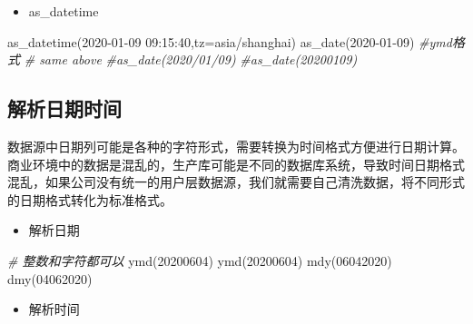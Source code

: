 \documentclass[
]{book}
\newenvironment{Shaded}{\begin{snugshade}}{\end{snugshade}}
\newcommand{\AttributeTok}[1]{\textcolor[rgb]{0.77,0.63,0.00}{#1}}
\newcommand{\CommentTok}[1]{\textcolor[rgb]{0.56,0.35,0.01}{\textit{#1}}}
\newcommand{\DecValTok}[1]{\textcolor[rgb]{0.00,0.00,0.81}{#1}}
\newcommand{\FunctionTok}[1]{\textcolor[rgb]{0.00,0.00,0.00}{#1}}
\newcommand{\NormalTok}[1]{#1}
\newcommand{\StringTok}[1]{\textcolor[rgb]{0.31,0.60,0.02}{#1}}
\providecommand{\tightlist}{%
  \setlength{\itemsep}{0pt}\setlength{\parskip}{0pt}}
\begin{document}
\begin{itemize}
\tightlist
\item
  as\_datetime
\end{itemize}

\begin{Shaded}
\begin{Highlighting}[]
\FunctionTok{as\_datetime}\NormalTok{(}\StringTok{\textquotesingle{}2020{-}01{-}09 09:15:40\textquotesingle{}}\NormalTok{,}\AttributeTok{tz=}\StringTok{\textquotesingle{}asia/shanghai\textquotesingle{}}\NormalTok{)}
\FunctionTok{as\_date}\NormalTok{(}\StringTok{\textquotesingle{}2020{-}01{-}09\textquotesingle{}}\NormalTok{) }\CommentTok{\#ymd格式}
\CommentTok{\# same above}
\CommentTok{\#as\_date(\textquotesingle{}2020/01/09\textquotesingle{})}
\CommentTok{\#as\_date(\textquotesingle{}20200109\textquotesingle{})}
\end{Highlighting}
\end{Shaded}

\hypertarget{ux89e3ux6790ux65e5ux671fux65f6ux95f4}{%
\subsection{解析日期时间}\label{ux89e3ux6790ux65e5ux671fux65f6ux95f4}}

数据源中日期列可能是各种的字符形式，需要转换为时间格式方便进行日期计算。商业环境中的数据是混乱的，生产库可能是不同的数据库系统，导致时间日期格式混乱，如果公司没有统一的用户层数据源，我们就需要自己清洗数据，将不同形式的日期格式转化为标准格式。

\begin{itemize}
\tightlist
\item
  解析日期
\end{itemize}

\begin{Shaded}
\begin{Highlighting}[]
\CommentTok{\# 整数和字符都可以}
\FunctionTok{ymd}\NormalTok{(}\DecValTok{20200604}\NormalTok{) }
\FunctionTok{ymd}\NormalTok{(}\StringTok{\textquotesingle{}20200604\textquotesingle{}}\NormalTok{)}
\FunctionTok{mdy}\NormalTok{(}\DecValTok{06042020}\NormalTok{)}
\FunctionTok{dmy}\NormalTok{(}\DecValTok{04062020}\NormalTok{)}
\end{Highlighting}
\end{Shaded}

\begin{itemize}
\tightlist
\item
  解析时间
\end{itemize}
\end{document}
